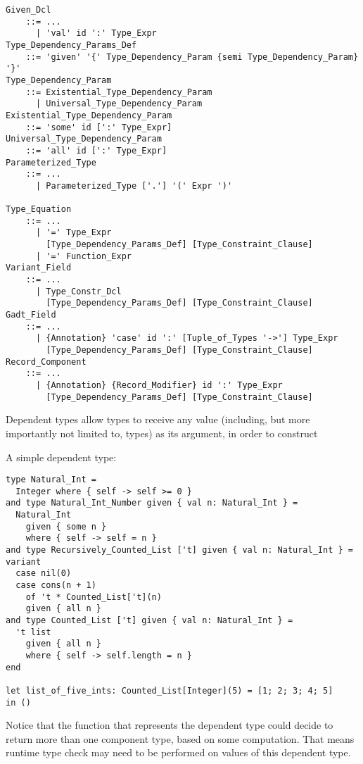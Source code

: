 \grammar\begin{lstlisting}[deletekeywords={with,where,as}]
Given_Dcl
    ::= ...
      | 'val' id ':' Type_Expr
Type_Dependency_Params_Def
    ::= 'given' '{' Type_Dependency_Param {semi Type_Dependency_Param} '}'
Type_Dependency_Param
    ::= Existential_Type_Dependency_Param
      | Universal_Type_Dependency_Param
Existential_Type_Dependency_Param
    ::= 'some' id [':' Type_Expr]
Universal_Type_Dependency_Param
    ::= 'all' id [':' Type_Expr]
Parameterized_Type
    ::= ...
      | Parameterized_Type ['.'] '(' Expr ')'
      
Type_Equation
    ::= ...
      | '=' Type_Expr 
        [Type_Dependency_Params_Def] [Type_Constraint_Clause]
      | '=' Function_Expr
Variant_Field
    ::= ...
      | Type_Constr_Dcl 
        [Type_Dependency_Params_Def] [Type_Constraint_Clause]
Gadt_Field
    ::= ...
      | {Annotation} 'case' id ':' [Tuple_of_Types '->'] Type_Expr 
        [Type_Dependency_Params_Def] [Type_Constraint_Clause]
Record_Component
    ::= ...
      | {Annotation} {Record_Modifier} id ':' Type_Expr
        [Type_Dependency_Params_Def] [Type_Constraint_Clause]
\end{lstlisting}

Dependent types allow types to receive any value (including, but more importantly not limited to, types) as its argument, in order to construct 

\example A simple dependent type:
\begin{lstlisting}
type Natural_Int =
  Integer where { self -> self >= 0 }
and type Natural_Int_Number given { val n: Natural_Int } =
  Natural_Int
    given { some n }
    where { self -> self = n }
and type Recursively_Counted_List ['t] given { val n: Natural_Int } = variant
  case nil(0)
  case cons(n + 1) 
    of 't * Counted_List['t](n)
    given { all n }
and type Counted_List ['t] given { val n: Natural_Int } =
  't list 
    given { all n }
    where { self -> self.length = n }
end

let list_of_five_ints: Counted_List[Integer](5) = [1; 2; 3; 4; 5]
in ()
\end{lstlisting}

Notice that the function that represents the dependent type could decide to return more than one component type, based on some computation. That means runtime type check may need to be performed on values of this dependent type.
















